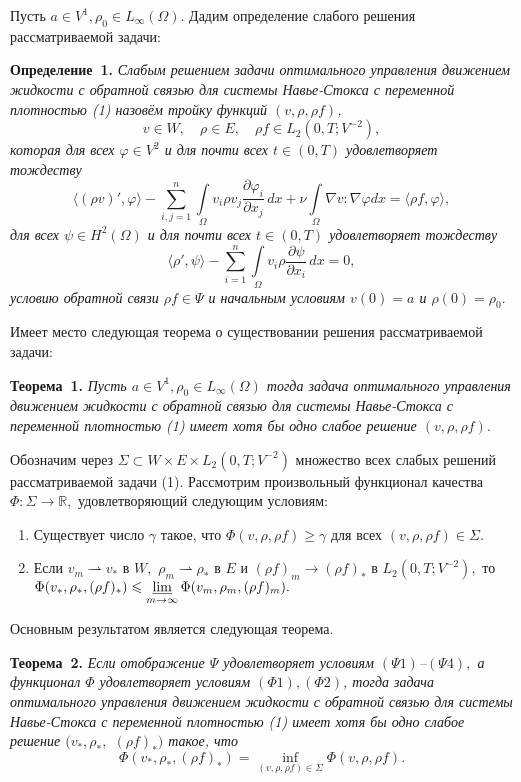 Пусть $a\in V^1, \rho_0\in L_\infty(\Omega).$ Дадим определение слабого решения рассматриваемой задачи:

\textbf{Определение~1.}
{\it Слабым решением задачи оптимального управления движением жидкости с обратной связью
для системы Навье-Стокса с переменной плотностью (1) назовём
\linebreak
тройку функций $({v},\rho,\rho f)$,
$$
{v}\in W,\quad \rho \in E, \quad \rho f\in L_2(0,T;V^{-2}),
$$
которая для всех $\varphi\in V^2$ и для почти всех $t\in(0,T)$ удовлетворяет тождеству
$$
\langle(\rho v)',\varphi\rangle-\sum_{i,j=1}^n\int\limits_{\Omega}{v}_i \rho {v}_j\frac{\partial \varphi_i}{\partial x_j}\,dx+\nu \int\limits_{\Omega} \nabla v: \nabla \varphi dx=\langle \rho f,\varphi\rangle,
$$
для всех $\psi\in H^2(\Omega)$ и для почти всех $t\in(0,T)$ удовлетворяет тождеству
$$
\langle\rho',\psi\rangle -\sum_{i=1}^n\int\limits_{\Omega}{v}_i \rho \frac{\partial \psi}{\partial x_i}\,dx=0,
$$
условию обратной связи $\rho f \in \Psi$ и начальным условиям ${v}(0)=a$ и $\rho(0)=\rho_0.$}

Имеет место следующая теорема о существовании решения рассматриваемой задачи:

\textbf{Теорема~1.} {\it Пусть $a\in V^1, \rho_0\in L_\infty(\Omega)$ тогда задача оптимального управления движением жидкости с обратной связью для системы Навье-Стокса с переменной плотностью (1) имеет хотя бы одно слабое решение $({v},\rho, \rho f).$}

\renewcommand{\theenumi}{\arabic{enumi}}
\renewcommand{\labelenumi}{($\Phi$\theenumi)}
\par Обозначим через $\Sigma \subset W\times E\times {L}_2(0,T;V^{-2})$ множество всех слабых решений рассматриваемой задачи (1). Рассмотрим
произвольный функционал качества $\Phi: \Sigma \to \mathbb{R},$
удовлетворяющий следующим условиям:
\begin{enumerate}
\item Существует число $\gamma$ такое, что $\Phi (v,\rho, \rho f) \geqslant \gamma$ для всех $(v,\rho, \rho f)\in \Sigma.$
\item Если $v_m \rightharpoonup v_*$ в $W,$ $\rho_m \rightharpoonup \rho_*$ в $E$ и $(\rho f)_m \to (\rho f)_*$ в
${L}_2(0,T;V^{-2}),$ то $\Phi (v_*,\rho_*,(\rho f)_*) \leqslant
\varliminf\limits_{m\to \infty} \Phi (v_m,\rho_m,(\rho f)_m).$
\end{enumerate}
Основным результатом является следующая теорема.

\textbf{Теорема~2.} {\it Если отображение $\Psi$ удовлетворяет условиям
$(\Psi 1)$--$(\Psi 4),$ а функционал $\Phi$ удовлетворяет условиям $(\Phi 1),(\Phi 2)$,
тогда задача оптимального управления движением жидкости с обратной связью для системы Навье-Стокса с переменной плотностью (1)
имеет хотя бы одно слабое решение $(v_*,\rho_*,$ $(\rho f)_*)$ такое, что
}
$$
\Phi (v_*,\rho_*,(\rho f)_*) = \inf\limits_{(v,\rho, \rho f)\in \Sigma}
\Phi (v,\rho,\rho f).$$
